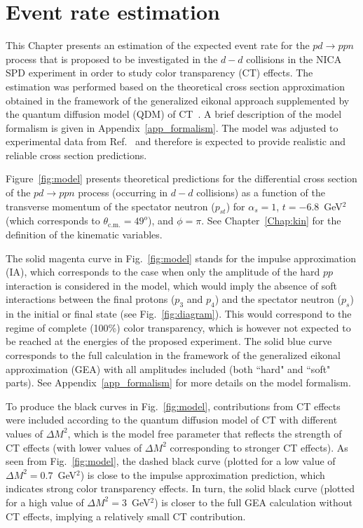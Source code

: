 \newpage
\chapter{Event rate estimation}
\mbox{}\vspace{-\baselineskip}
\label{chapter_rate}

This Chapter presents an estimation of the expected event rate for the $pd\rightarrow ppn$ process that is proposed to be investigated in the $d-d$ collisions in the NICA SPD experiment in order to study color transparency (CT) effects. The estimation was performed based on the theoretical cross section approximation obtained in the framework of the generalized eikonal approach supplemented by the quantum diffusion model (QDM) of CT~\cite{Frankfurt:1996uz,PhysRevC.107.014605,Larionov:2025equ,Farrar:1988me}. A brief description of the model formalism is given in Appendix~\ref{app_formalism}. The model was adjusted to experimental data from Ref.~\cite{Cocconi:1965zz} and therefore is expected to provide realistic and reliable cross section predictions.


Figure~\ref{fig:model} presents theoretical predictions for the differential cross section of the $pd\rightarrow ppn$ process (occurring in $d-d$ collisions) as a function of the transverse momentum of the spectator neutron ($p_{st}$) for $\alpha_{s} =1$, $t=-6.8$~GeV$^2$ (which corresponds to $\theta_{\textrm{c.m.}}=49^{o}$), and $\phi=\pi$. See Chapter~\ref{Chap:kin} for the definition of the kinematic variables. 


The solid magenta curve in Fig.~\ref{fig:model} stands for the impulse approximation (IA), which corresponds to the case when only the amplitude of the hard $pp$ interaction is considered in the model, which would imply the absence of soft interactions between the final protons ($p_{3}$ and $p_{4}$) and the spectator neutron ($p_{s}$) in the initial or final state (see Fig.~\ref{fig:diagram}). This would correspond to the regime of complete (100\%) color transparency, which is however not expected to be reached at the energies of the proposed experiment. The solid blue curve corresponds to the full calculation in the framework of the generalized eikonal approximation (GEA) with all amplitudes included (both ``hard" and ``soft" parts). See Appendix~\ref{app_formalism} for more details on the model formalism.

To produce the black curves in Fig.~\ref{fig:model}, contributions from CT effects were included according to the quantum diffusion model of CT with different values of $\Delta M^{2}$, which is the model free parameter that reflects the strength of CT effects (with lower values of $\Delta M^{2}$ corresponding to stronger CT effects). As seen from Fig.~\ref{fig:model}, the dashed black curve (plotted for a low value of $\Delta M^{2}=0.7$~GeV$^2$) is close to the impulse approximation prediction, which indicates strong color transparency effects. In turn, the solid black curve (plotted for a high value of $\Delta M^{2}=3$~GeV$^2$) is closer to the full GEA calculation without CT effects, implying a relatively small CT contribution.

